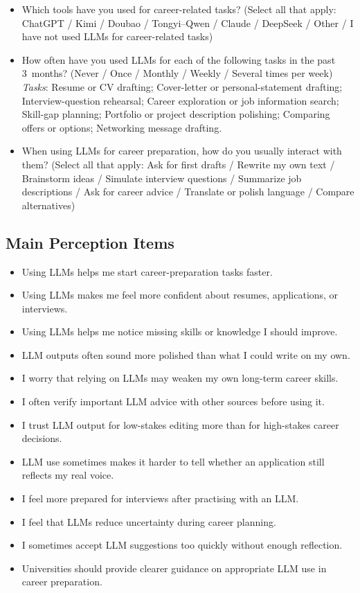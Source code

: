 \documentclass[sigconf,review,anonymous]{acmart}
\begin{document}
\begin{itemize}
  \item[\textbf{U1.}] Which tools have you used for career-related tasks?
    (Select all that apply: ChatGPT / Kimi / Doubao / Tongyi--Qwen / Claude
    / DeepSeek / Other / I have not used LLMs for career-related tasks)
  \item[\textbf{U2.}] How often have you used LLMs for each of the following
    tasks in the past 3~months? (Never / Once / Monthly / Weekly / Several
    times per week) \textit{Tasks}: Resume or CV drafting; Cover-letter or
    personal-statement drafting; Interview-question rehearsal; Career
    exploration or job information search; Skill-gap planning; Portfolio or
    project description polishing; Comparing offers or options; Networking
    message drafting.
  \item[\textbf{U3.}] When using LLMs for career preparation, how do you
    usually interact with them? (Select all that apply: Ask for first drafts
    / Rewrite my own text / Brainstorm ideas / Simulate interview questions /
    Summarize job descriptions / Ask for career advice / Translate or polish
    language / Compare alternatives)
\end{itemize}

\subsection*{Main Perception Items}

\begin{itemize}
  \item[\textbf{P1.}] Using LLMs helps me start career-preparation tasks
    faster.
  \item[\textbf{P2.}] Using LLMs makes me feel more confident about resumes,
    applications, or interviews.
  \item[\textbf{P3.}] Using LLMs helps me notice missing skills or knowledge
    I should improve.
  \item[\textbf{P4.}] LLM outputs often sound more polished than what I
    could write on my own.
  \item[\textbf{P5.}] I worry that relying on LLMs may weaken my own
    long-term career skills.
  \item[\textbf{P6.}] I often verify important LLM advice with other sources
    before using it.
  \item[\textbf{P7.}] I trust LLM output for low-stakes editing more than
    for high-stakes career decisions.
  \item[\textbf{P8.}] LLM use sometimes makes it harder to tell whether an
    application still reflects my real voice.
  \item[\textbf{P9.}] I feel more prepared for interviews after practising
    with an LLM.
  \item[\textbf{P10.}] I feel that LLMs reduce uncertainty during career
    planning.
  \item[\textbf{P11.}] I sometimes accept LLM suggestions too quickly
    without enough reflection.
  \item[\textbf{P12.}] Universities should provide clearer guidance on
    appropriate LLM use in career preparation.
\end{itemize}
\end{document}
